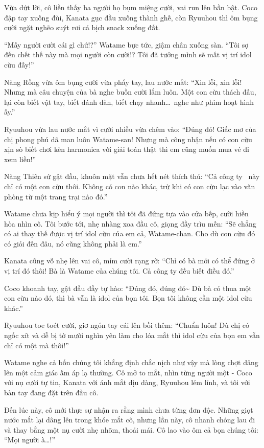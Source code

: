\documentclass[../main.tex]{subfiles}
\begin{document}
Vừa dứt lời, cô liền thấy ba người họ bụm miệng cười, vai run lên bần bật. Coco đập tay xuống đùi, Kanata gục đầu xuống thành ghế, còn Ryuuhou thì ôm bụng cười ngặt nghẽo suýt rơi cả bịch snack xuống đất.

``Mấy người cười cái gì chứ!?'' Watame bực tức, giậm chân xuống sàn. ``Tôi sợ đến chết thế này mà mọi người còn cười!? Tôi đã tưởng mình sẽ mất vị trí idol cừu đấy!''

Nàng Rồng vừa ôm bụng cười vừa phẩy tay, lau nước mắt: ``Xin lỗi, xin lỗi! Nhưng mà câu chuyện của bà nghe buồn cười lắm luôn. Một con cừu thách đấu, lại còn biết vật tay, biết đánh đàn, biết chạy nhanh\dots\ nghe như phim hoạt hình ấy.''

Ryuuhou vừa lau nước mắt vì cười nhiều vừa chêm vào: ``Đúng đó! Giấc mơ của chị phong phú dã man luôn Watame-san! Nhưng mà công nhận nếu có con cừu xịn sò biết chơi kèn harmonica với giải toán thật thì em cũng muốn mua vé đi xem liền!''

Nàng Thiên sứ gật đầu, khuôn mặt vẫn chưa hết nét thích thú: ``Cả công ty \hll\ này chỉ có một con cừu thôi. Không có con nào khác, trừ khi có con cừu lạc vào văn phòng từ một trang trại nào đó.''

Watame chưa kịp hiểu ý mọi người thì tôi đã đứng tựa vào cửa bếp, cười hiền hòa nhìn cô. Tôi bước tới, nhẹ nhàng xoa đầu cô, giọng đầy trìu mến: ``Sẽ chẳng có ai thay thế được vị trí idol cừu của em cả, Watame-chan. Cho dù con cừu đó có giỏi đến đâu, nó cũng không phải là em.''

Kanata cũng vỗ nhẹ lên vai cô, mỉm cười rạng rỡ: ``Chỉ có bà mới có thể đứng ở vị trí đó thôi! Bà là Watame của chúng tôi. Cả công ty đều biết điều đó.''

Coco khoanh tay, gật đầu đầy tự hào: ``Đúng đó, đúng đó\~{} Dù bà có thua một con cừu nào đó, thì bà vẫn là idol của bọn tôi. Bọn tôi không cần một idol cừu khác.''

Ryuuhou toe toét cười, giơ ngón tay cái lên bồi thêm: ``Chuẩn luôn! Dù chị có ngốc xít và dễ bị tờ mười nghìn yên làm cho lóa mắt thì idol cừu của bọn em vẫn chỉ có một mà thôi!''

Watame nghe cả bốn chúng tôi khẳng định chắc nịch như vậy mà lòng chợt dâng lên một cảm giác ấm áp lạ thường. Cô mở to mắt, nhìn từng người một - Coco với nụ cười tự tin, Kanata với ánh mắt dịu dàng, Ryuuhou lém lỉnh, và tôi với bàn tay đang đặt trên đầu cô.

Đến lúc này, cô mới thực sự nhận ra rằng mình chưa từng đơn độc. Những giọt nước mắt lại dâng lên trong khóe mắt cô, nhưng lần này, cô nhanh chóng lau đi và thay bằng một nụ cười nhẹ nhõm, thoải mái. Cô lao vào ôm cả bọn chúng tôi: ``Mọi người à\dots!''
\end{document}
